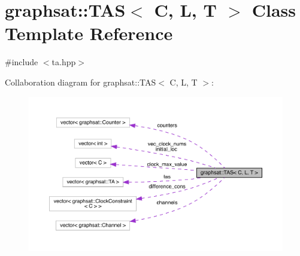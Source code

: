 \hypertarget{classgraphsat_1_1_t_a_s}{}\section{graphsat\+::T\+AS$<$ C, L, T $>$ Class Template Reference}
\label{classgraphsat_1_1_t_a_s}


{\ttfamily \#include $<$ta.\+hpp$>$}



Collaboration diagram for graphsat\+::T\+AS$<$ C, L, T $>$\+:
\nopagebreak
\begin{figure}[H]
\begin{center}
\leavevmode
\includegraphics[width=350pt]{classgraphsat_1_1_t_a_s__coll__graph}
\end{center}
\end{figure}
